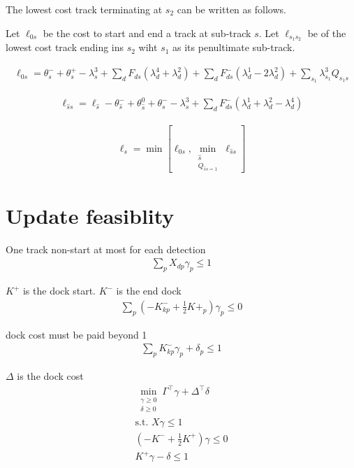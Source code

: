 \documentclass{article}
\begin{document}
The lowest cost track terminating at $s_2$ can be written as follows.  

Let $\ell_{0s}$ be the cost to start and end a track at sub-track $s$.  Let $\ell_{s_1s_2}$ be of the lowest cost track ending ins $s_2$ wiht $s_1$ as its penultimate sub-track.  

\begin{align}
\ell_{0s}=\theta^-_s+\theta^+_s-\lambda^3_s+\sum_{d}F_{ds}(\lambda^4_d+\lambda^2_d)+\sum_{d}F^-_{ds}(\lambda^1_d-2\lambda^2_d)+ \sum_{s_1} \lambda^3_{s_1}Q_{s_1s}
\end{align}

\begin{align}
\ell_{\hat{s}s}=\ell_{\hat{s}}-\theta^-_{\hat{s}}+\theta^0_{\hat{s}}+\theta^-_s-\lambda^3_s+\sum_{d}F^-_{ds}(\lambda^1_d+\lambda^2_d-\lambda^4_d) %
\end{align}

\begin{align}
\ell_s=\min [\ell_{0s},\min_{\substack{\hat{s} \\ Q_{\hat{s}s=1}}}\ell_{\hat{s}s}]
\end{align}

\section{Update feasiblity}

One track non-start at most for each detection
\begin{align}
\sum_{p} X_{dp}\gamma_p \leq 1
\end{align}

$K^+$ is the dock start.  $K^-$ is the end dock
\begin{align}
\sum_{p}(-K^-_{kp}+\frac{1}{2}K+_p)\gamma_p \leq 0
\end{align}

dock cost must be paid beyond 1
\begin{align}
\sum_{p}K^-_{kp}\gamma_p+\delta_p \leq 1
\end{align}

$\Delta$ is the dock cost
\begin{align}
\min_{\substack{\gamma \geq 0 \\ \delta \geq 0}}\Gamma^{\top}\gamma + \Delta^{\top}\delta\\
\nonumber \mbox{s.t.   } X\gamma \leq 1\\
\nonumber (-K^-+\frac{1}{2}K^+)\gamma \leq 0\\
\nonumber K^{+}\gamma-\delta \leq 1
\end{align}
\end{document}
